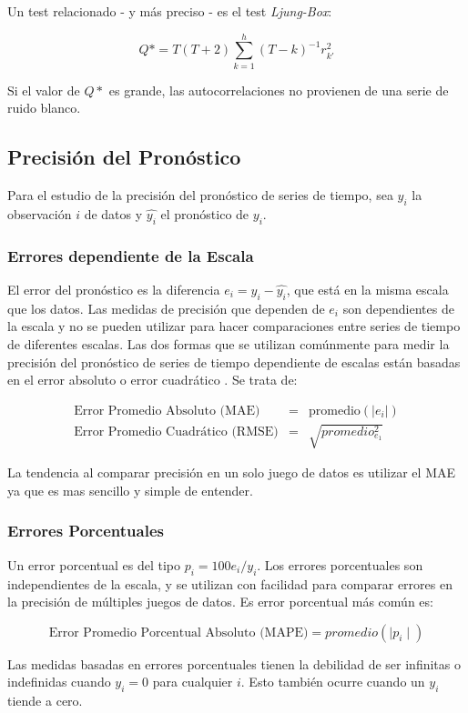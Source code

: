 Un test relacionado - y más preciso - es el test \emph{Ljung-Box}:

\[ Q* = T(T+2) \sum_{k=1}^{h}(T-k)^{-1}r_{k\prime}^{2} \]

Si el valor de $Q*$ es grande, las autocorrelaciones no provienen de una serie de ruido blanco.

\subsection*{Precisión del Pronóstico}
Para el estudio de la precisión del pronóstico de series de tiempo, sea $y_i$ la observación $i$ de datos y $\hat{y_i}$ el pronóstico de $y_i$.

\subsubsection{Errores dependiente de la Escala}
El error del pronóstico es la diferencia $e_i = y_i - \hat{y_i}$, que está en la misma escala que los datos. Las medidas de precisión que dependen de $e_i$ son dependientes de la escala y no se pueden utilizar para hacer comparaciones entre series de tiempo de diferentes escalas. Las dos formas que se utilizan comúnmente para medir la precisión del pronóstico de series de tiempo dependiente de escalas están basadas en el error absoluto o error cuadrático \cite{hyndman}. Se trata de:

\begin{eqnarray*}
	\text{Error Promedio Absoluto (MAE)}& = &\text{promedio}(|e_{i}|) \\
	\text{Error Promedio Cuadrático (RMSE)}& = &\sqrt{promedio_{e_1}^2}
\end{eqnarray*}

La tendencia al comparar precisión en un solo juego de datos es utilizar el MAE ya que es mas sencillo y simple de entender.

\subsubsection{Errores Porcentuales}
Un error porcentual es del tipo $p_i = 100 e_i / y_i$. Los errores porcentuales son independientes de la escala, y se utilizan con facilidad para comparar errores en la precisión de múltiples juegos de datos. Es error porcentual más común es:

\[ \text{Error Promedio Porcentual Absoluto (MAPE)} = promedio(\mid p_i \mid) \]

Las medidas basadas en errores porcentuales tienen la debilidad de ser infinitas o indefinidas cuando $y_i = 0$ para cualquier $i$. Esto también ocurre cuando un $y_i$ tiende a cero.

